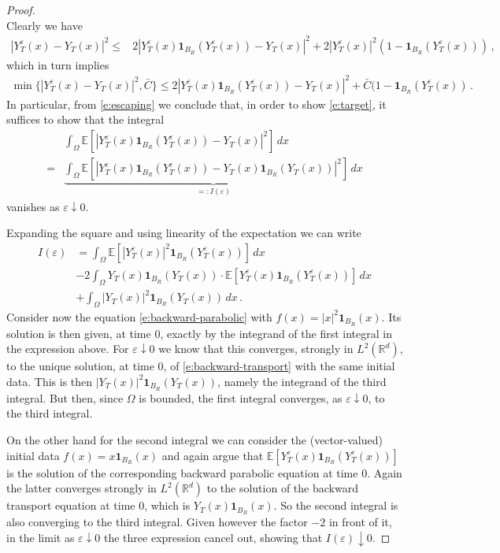 \documentclass[10pt,a4paper]{amsart}
\begin{document}
\begin{proof}
\begin{equation}
\end{equation}
Clearly we have 
\begin{align*}
|Y^\varepsilon_T (x) - Y_T (x)|^2
\leq & 2 |Y^\varepsilon_T (x) \mathbf{1}_{B_R} (Y^\varepsilon_T (x)) - Y_T (x)|^2
+ 2 |Y^\varepsilon_T (x)|^2 (1-\mathbf{1}_{B_R} (Y^\varepsilon_T (x)))\, , 
\end{align*}
which in turn implies 
\begin{align*}
\min \{|Y^\varepsilon_T (x) - Y_T (x)|^2, \bar C\}
\leq 2  |Y^\varepsilon_T (x) \mathbf{1}_{B_R} (Y^\varepsilon_T (x)) - Y_T (x)|^2
+ \bar C (1-\mathbf{1}_{B_R} (Y^\varepsilon_T (x))\, .
\end{align*}
In particular, from \eqref{e:escaping} we conclude that, in order to show \eqref{e:target}, it suffices to show that the integral
\begin{align*}
&\int_\Omega {\mathbb E} [|Y_T^\varepsilon (x) \mathbf{1}_{B_R} (Y_T^\varepsilon (x)) - Y_T (x) |^2]\, dx \\
= & \underbrace{\int_\Omega {\mathbb E} [|Y_T^\varepsilon (x) \mathbf{1}_{B_R} (Y_T^\varepsilon (x)) - Y_T (x)\mathbf{1}_{B_R} (Y_T (x)) |^2]\, dx}_{=: I (\varepsilon)}
\end{align*}
vanishes as $\varepsilon\downarrow 0$. 

Expanding the square and using linearity of the expectation we can write 
\begin{align*}
I (\varepsilon) &= \int_\Omega {\mathbb E} [|Y_T^\varepsilon (x)|^2 \mathbf{1}_{B_R} (Y_T^\varepsilon (x))]\, dx\\
& - 2 \int_\Omega Y_T (x) \mathbf{1}_{B_R} (Y_T (x)) \cdot {\mathbb E} [Y_T^\varepsilon (x) \mathbf{1}_{B_R} (Y_T^\varepsilon (x))]\, dx\\
&+ \int_\Omega |Y_T (x)|^2\mathbf{1}_{B_R} (Y_T (x)) \, dx\, . 
\end{align*}
Consider now the equation \eqref{e:backward-parabolic} with $f (x) = |x|^2 \mathbf{1}_{B_R} (x)$. Its solution is then given, at time $0$, exactly by the integrand of the first integral in the expression above. For $\varepsilon\downarrow 0$ we know that this converges, strongly in $L^2 (\mathbb R^d)$, to the unique solution, at time $0$, of \eqref{e:backward-transport} with the same initial data. This is then $|Y_T (x)|^2 \mathbf{1}_{B_R} (Y_T (x))$, namely the integrand of the third integral. But then, since $\Omega$ is bounded, the first integral converges, as $\varepsilon\downarrow 0$, to the third integral. 

On the other hand for the second integral we can consider the (vector-valued) initial data $f (x) = x \mathbf{1}_{B_R} (x)$ and again argue that ${\mathbb E}  [Y_T^\varepsilon (x) \mathbf{1}_{B_R} (Y_T^\varepsilon (x))]$ is the solution of the corresponding backward parabolic equation at time $0$. Again the latter converges strongly in $L^2 (\mathbb R^d)$ to the solution of the backward transport equation at time $0$, which is $Y_T (x) \mathbf{1}_{B_R} (x)$. So the second integral is also converging to the third integral. Given however the factor $-2$ in front of it, in the limit as $\varepsilon\downarrow 0$ the three expression cancel out, showing that $I (\varepsilon)\downarrow 0$. 
\end{proof}
\end{document}
